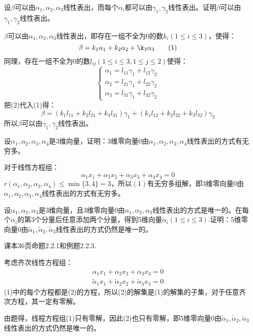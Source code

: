 \documentclass[a4paper]{report}
\begin{document}
\EX 设$\beta$可以由$\alpha_1,\alpha_2,\alpha_3$线性表出，而每个$\alpha_i$都可以由$\gamma_1,\gamma_2$线性表出。证明$\beta$可以由$\gamma_1,\gamma_2$线性表出。

\begin{zhengming}
$\beta$可以由$\alpha_1,\alpha_2,\alpha_3$线性表出，即存在一组不全为0的数$k_i(1\leq i\leq3)$，使得：
\begin{equation*}
\beta = k_1\alpha_1+k_2\alpha_2+\k_3\alpha_3\tag{1}
\end{equation*}
同理，存在一组不全为0的数$l_{ij}(1\leq i\leq 3,1\leq j\leq 2)$使得：
\begin{equation*}
  \begin{cases}
    \alpha_1=l_{11}\gamma_{1}+l_{12}\gamma_{2}\\
    \alpha_2=l_{21}\gamma_{1}+l_{22}\gamma_{2}\\
    \alpha_3=l_{31}\gamma_{1}+l_{32}\gamma_{2}
  \end{cases}\tag{2}
\end{equation*}
把(2)代入(1)得：
\begin{equation*}
\beta=(k_1l_{11}+k_2l_{21}+k_3l_{31})\gamma_{1}+(k_1l_{12}+k_2l_{22}+k_3l_{32})\gamma_{2}
\end{equation*}
所以$\beta$可以由$\gamma_1,\gamma_2$线性表出。
\end{zhengming}

\EX 设$\alpha_1,\alpha_2,\alpha_3,\alpha_4$是3维向量，证明：3维零向量$0$由$\alpha_1,\alpha_2,\alpha_3,\alpha_4$线性表出的方式有无穷多。

\begin{zhengming}
对于线性方程组：
\begin{equation*}
\alpha_1x_1+\alpha_2x_2+\alpha_3x_3+\alpha_4x_4=0\tag{1}
\end{equation*}
$r(\alpha_1,\alpha_2,\alpha_3,\alpha_4)\leq\min\{3,4\}=3$，所以$(1)$有无穷多组解，即3维零向量$0$由$\alpha_1,\alpha_2,\alpha_3,\alpha_4$线性表出的方式有无穷多。
\end{zhengming}

\EX 设$\alpha_1,\alpha_2,\alpha_3$是3维向量，且3维零向量$0$由$\alpha_1,\alpha_2,\alpha_3$线性表出的方式是唯一的。在每个$\alpha_i$的第3个分量后任意添加两个分量，得到5维向量$\widetilde{\alpha}_{i}(1\leq i\leq 3)$.证明：5维零向量$0$由$\widetilde{\alpha}_{1},\widetilde{\alpha}_{2},\widetilde{\alpha}_{3}$线性表出的方式仍然是唯一的。

\begin{zhengming}
课本36页命题2.2.1和例题2.2.3.

考虑齐次线性方程组：
\begin{gather*}
\alpha_1x_1+\alpha_2x_2+\alpha_3x_3=0\tag{1}\\
\widetilde{\alpha} _{1}x_1+\widetilde{\alpha}_{2}x_2+\widetilde{\alpha}_{3}x_3=0\tag{2}
\end{gather*}
(1)中的每个方程都是(2)的方程，所以(2)的解集是(1)的解集的子集，对于任意齐次方程，其一定有零解。

由题得，线程方程组(1)只有零解，因此(2)也只有零解，即5维零向量$0$由$\widetilde{\alpha}_{1},\widetilde{\alpha}_{2},\widetilde{\alpha}_{3}$线性表出的方式仍然是唯一的。
\end{zhengming}
\end{document}
